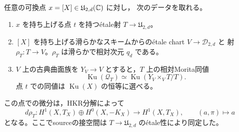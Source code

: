 \begin{theorem}
\label{thm:surface-ku-etale-companion}
任意の可換点 $x=[X]\in\mathfrak U_{2,d}(\mathbb C)$ に対し，
次のデータを取れる。
\begin{enumerate}
 \item $x$ を持ち上げる点 $t$ を持つ\'{e}tale射
       $T\to\mathfrak U_{2,d}$。
 \item $[X]$ を持ち上げる滑らかなスキームからの\'{e}tale chart $V\to\mathcal D_{2,d}$ と
       射 $\rho_T:T\to V$。$\rho_T$ は滑らかで相対次元 $q_d$ である。
 \item $V$ 上の古典曲面族を $Y_V\to V$ とすると，$T$ 上の相対Morita同値
       \begin{equation}\label{eq:surface-ku-relative-companion}
        \operatorname{Ku}(\mathcal Q_T)
          \simeq\operatorname{Ku}(Y_V\times_VT/T).
       \end{equation}
       点 $t$ での同値は $\operatorname{Ku}(X)$ の恒等に選べる。
\end{enumerate}
この点での微分は，HKR分解によって
\begin{equation}\label{eq:surface-ku-companion-differential}
 d\rho_T:
 H^1(X,T_X)\oplus H^0(X,-K_X)\longrightarrow H^1(X,T_X),
 \qquad (a,\pi)\longmapsto a
\end{equation}
となる。ここでsourceの接空間は $T\to\mathfrak U_{2,d}$ の\'{e}tale性により同定した。
\end{theorem}
